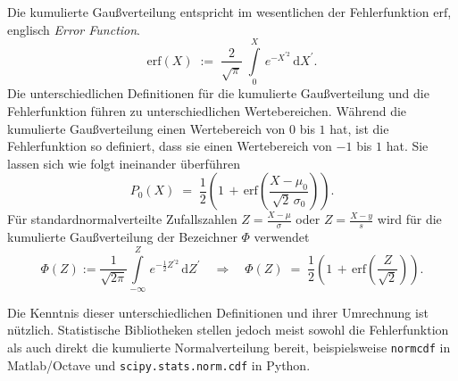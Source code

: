 Die kumulierte Gaußverteilung entspricht im wesentlichen der
Fehlerfunktion $\mathrm{erf}$, englisch \textsl{Error Function}.
\begin{equation}
\mathrm{erf}(X) \; := \; \frac{2}{\sqrt{\pi}} \; \int\limits_0^X \, e^{-X^{\prime 2}} \, \mathrm{d} X^\prime.
\label{erf}
\end{equation}
Die unterschiedlichen Definitionen für die kumulierte Gaußverteilung
und die Fehlerfunktion führen zu unterschiedlichen Wertebereichen.
Während die kumulierte Gaußverteilung einen Wertebereich von $0$ bis $1$ hat, ist die Fehlerfunktion so
definiert, dass sie einen Wertebereich von $-1$ bis $1$ hat. Sie lassen sich wie folgt ineinander
überführen
\begin{equation}
P_0(X) \; = \; \frac{1}{2} \left(1 \, + \, \mathrm{erf}(\frac{X - \mu_0}{\sqrt{2} \, \sigma_0})\right).
\end{equation}
Für standardnormalverteilte Zufallszahlen $Z = \frac{X-\mu}{\sigma}$ oder $Z = \frac{X-y}{s}$
wird für die kumulierte Gaußverteilung der Bezeichner $\Phi$ verwendet
\begin{equation}
 \Phi(Z) := \frac{1}{\sqrt{2\pi}}
\int\limits_{-\infty}^Z \, e^{-\frac{1}{2} Z^{\prime 2} } \, \mathrm{d} Z^\prime
\quad \Rightarrow \quad
\Phi(Z) \; = \; \frac{1}{2} \left(1 \, + \, \mathrm{erf}(\frac{Z}{\sqrt{2}})\right).
\label{cdfPhi}
\end{equation}

Die Kenntnis dieser unterschiedlichen Definitionen und ihrer Umrechnung ist nützlich.
Statistische Bibliotheken stellen jedoch meist sowohl die Fehlerfunktion als auch direkt
die kumulierte Normalverteilung bereit, beispielsweise \texttt{normcdf} in Matlab/Octave und
\texttt{scipy.stats.norm.cdf} in Python.

